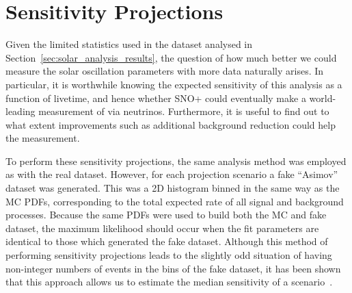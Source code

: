 
    
\section{Sensitivity Projections}\label{sec:solar_projections}
Given the limited statistics used in the dataset analysed in Section~\ref{sec:solar_analysis_results}, the question of how much better we could measure the solar oscillation parameters with more data naturally arises. In particular, it is worthwhile knowing the expected sensitivity of this analysis as a function of livetime, and hence whether SNO+ could eventually make a world-leading measurement of \tonetwo{} via \beight{} neutrinos. Furthermore, it is useful to find out to what extent improvements such as additional background reduction could help the measurement.

To perform these sensitivity projections, the same analysis method was employed as with the real dataset. However, for each projection scenario a fake ``Asimov'' dataset was generated. This was a 2D histogram binned in the same way as the MC PDFs, corresponding to the total expected rate of all signal and background processes. Because the same PDFs were used to build both the MC and fake dataset, the maximum likelihood should occur when the fit parameters are identical to those which generated the fake dataset. Although this method of performing sensitivity projections leads to the slightly odd situation of having non-integer numbers of events in the bins of the fake dataset, it has been shown that this approach allows us to estimate the median sensitivity of a scenario~\cite{cowanAsymptoticFormulaeLikelihoodbased2011}. %

